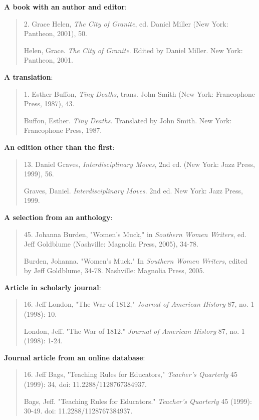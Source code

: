\textbf{A book with an author and editor}:

\begin{quote}
 2. Grace Helen, \emph{The City of Granite}, ed. Daniel Miller (New York: Pantheon, 
2001), 50.

Helen, Grace. \emph{The City of Granite}. Edited by Daniel Miller. New York:  Pantheon, 
2001.
\end{quote}

\textbf{A translation}:
\begin{quote}
 1. Esther Buffon, \emph{Tiny Deaths}, trans. John Smith (New York: Francophone Press, 
1987), 43.

Buffon, Esther. \emph{Tiny Deaths}. Translated by John Smith. New York:  Francophone 
Press, 1987.
\end{quote}


\textbf{An edition other than the first}:

\begin{quote}
 13. Daniel Graves, \emph{Interdisciplinary Moves}, 2nd ed. (New York: Jazz Press, 1999),
56.

Graves, Daniel. \emph{Interdisciplinary Moves}. 2nd ed. New York: Jazz Press,  1999.
\end{quote}

\textbf{A selection from an anthology}:
\begin{quote}

 45. Johanna Burden, "Women's Muck," in \emph{Southern Women Writers}, ed. Jeff 
Goldblume (Nashville: Magnolia Press, 2005), 34-78.

Burden, Johanna. "Women's Muck." In \emph{Southern Women Writers},  edited by Jeff 
Goldblume, 
34-78. Nashville: Magnolia Press, 2005.
\end{quote}

\textbf{Article in scholarly journal}:
\begin{quote}
 16. Jeff London, "The War of 1812," \emph{Journal of American History} 87, no. 1 
(1998): 10.

London, Jeff. "The War of 1812." \emph{Journal of American History} 87, no. 1 (1998): 
1-24.
\end{quote}

\textbf{Journal article from an online database}:
\begin{quote}

 16. Jeff Bags, "Teaching Rules for Educators," \emph{Teacher's Quarterly} 45 (1999): 
34, doi: 11.2288/1128767384937.

Bags, Jeff. "Teaching Rules for Educators." \emph{Teacher's Quarterly} 45  (1999): 30-49. 
doi: 11.2288/1128767384937.
\end{quote}

